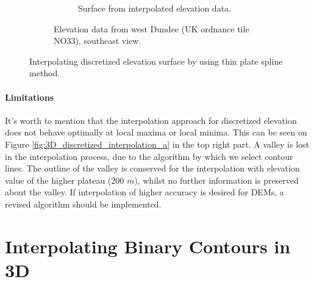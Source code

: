 \documentclass[a4paper,10pt]{report}
\begin{document}
\begin{figure}[H]
\begin{subfigure}{\textwidth}
\begin{subfigure}{.49\textwidth}
        \addtocounter{subfigure}{-1}
        \renewcommand\thesubfigure{\alph{subfigure}) ii}
        \caption{Surface from interpolated elevation data.}
        \end{subfigure}
        \addtocounter{subfigure}{-1}
        \renewcommand\thesubfigure{\alph{subfigure}}
        \caption{Elevation data from west Dundee (UK ordnance tile NO33), southeast view.}
        \label{fig:3D_discretized_interpolation_b}
    \end{subfigure}
    \caption{Interpolating discretized elevation surface by using thin plate spline method.}
    \label{fig:3D_discretized_interpolation}
\end{figure}

\subsubsection{Limitations}
It's worth to mention that the interpolation approach for discretized elevation does not behave optimally at local maxima or local minima. This can be seen on Figure \ref{fig:3D_discretized_interpolation_a} in the top right part. A valley is lost in the interpolation process, due to the algorithm by which we select contour lines. The outline of the valley is conserved for the interpolation with elevation value of the higher plateau ($200$ $m$), whilst no further information is preserved about the valley. If interpolation of higher accuracy is desired for DEMs, a revised algorithm should be implemented.

\chapter{Interpolating Binary Contours in 3D}\label{chap:3D}
\end{document}
